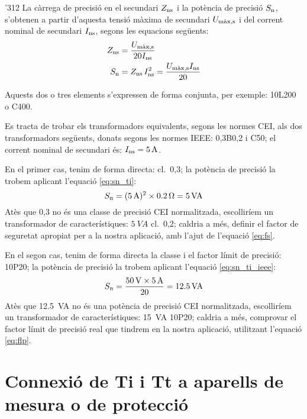 \begin{dingautolist}{'312}
    La càrrega de precisió en el secundari
    $Z_\mathrm{ns}$ i la potència de precisió $S_\mathrm{n}$, s'obtenen a partir d'aquesta
    tensió màxima de secundari $U_\mathrm{m\grave{a}x,s}$
    i del corrent     nominal de secundari $I_\mathrm{ns}$, segons les equacions següents:
    \begin{align}
        Z_\mathrm{ns} &= \frac{U_\mathrm{m\grave{a}x,s}}{20 I_\mathrm{ns}}\\
        S_\mathrm{n} &= Z_\mathrm{ns} \,I_\mathrm{ns}^2 = \frac{U_\mathrm{m\grave{a}x,s} I_\mathrm{ns}}{20}
        \label{eq:sn_ti_ieee}
    \end{align}
\end{dingautolist}

Aquests dos o tres elements s'expressen de forma conjunta, per exemple:
10L200 o C400.


\begin{exemple}
    Es tracta de trobar els transformadors equivalents, segons les normes CEI, als dos
    transformadors següents, donats segons les normes IEEE: 0,3B0,2 i
    C50; el corrent nominal de secundari és:    $I_\mathrm{ns}=\SI{5}{A}$.

    En el primer cas, tenim de forma directa: cl.~0,3; la potència de precisió la trobem
    aplicant l'equació \eqref{eq:sn_ti}:
    \[
        S_\mathrm{n} =(\SI{5}{A})^2 \times \SI{0,2}{\ohm} =  \SI{5}{VA}
    \]
    Atès que 0,3 no és una classe de precisió CEI normalitzada,
    escolliríem un transformador de característiques: $\SI{5}{VA}$ cl.~0,2; caldria a més, definir el factor de
    seguretat apropiat per a la nostra aplicació, amb l'ajut de l'equació \eqref{eq:fs}.

    En el segon cas, tenim de forma directa la classe i el factor límit de
    precisió: 10P20; la potència de precisió la trobem
    aplicant l'equació \eqref{eq:sn_ti_ieee}:
    \[
        S_\mathrm{n} = \frac{\SI{50}{V} \times\SI{5}{A}}{20} = \SI{12,5}{VA}
    \]
    Atès que \SI{12,5}{VA} no és una potència de precisió CEI normalitzada,
     escolliríem un transformador de característiques:
    \SI{15}{VA} 10P20; caldria a més, comprovar el factor límit de precisió real
    que tindrem en la nostra aplicació, utilitzant l'equació \eqref{eq:flp}.
\end{exemple}

\section{Connexió de Ti i Tt a aparells de mesura o de
protecció}\label{sec:conex_ti_tt}

